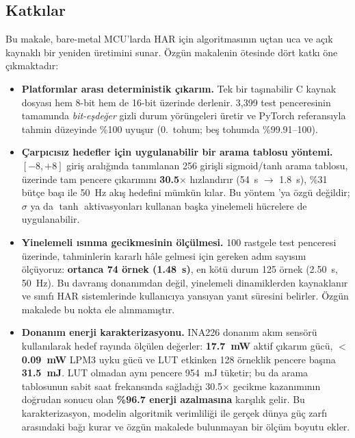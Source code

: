 \subsection{Katkılar}

Bu makale, bare-metal MCU'larda HAR için \fastgrnn{} algoritmasının
uçtan uca ve açık kaynaklı bir yeniden üretimini sunar. Özgün
makalenin ötesinde dört katkı öne çıkmaktadır:

\begin{itemize}
\item \textbf{Platformlar arası deterministik çıkarım.} Tek bir
taşınabilir C kaynak dosyası hem 8-bit \arduino{} hem de 16-bit
\msp{} üzerinde derlenir. 3{,}399 test penceresinin tamamında
\emph{bit-eşdeğer} gizli durum yörüngeleri üretir ve PyTorch
referansıyla tahmin düzeyinde \%100 uyuşur (0.~tohum; beş
tohumda \%99.91--100).

\item \textbf{Çarpıcısız hedefler için uygulanabilir bir arama
tablosu yöntemi.} $[-8, +8]$ giriş aralığında tanımlanan 256 girişli
sigmoid/tanh arama tablosu, \msp{} üzerinde tam pencere çıkarımını
\textbf{30.5$\times$} hızlandırır (54~s $\rightarrow$ 1.8~s), \%31
bütçe başı ile 50~Hz akış hedefini mümkün kılar. Bu yöntem
\fastgrnn{}'ya özgü değildir; $\sigma$ ya da $\tanh$ aktivasyonları
kullanan başka yinelemeli hücrelere de uygulanabilir.

\item \textbf{Yinelemeli ısınma gecikmesinin ölçülmesi.} 100 rastgele
test penceresi üzerinde, tahminlerin kararlı hâle gelmesi için gereken
adım sayısını ölçüyoruz: \textbf{ortanca 74 örnek (1.48~s)}, en kötü
durum 125 örnek (2.50~s, 50~Hz). Bu davranış donanımdan değil,
yinelemeli dinamiklerden kaynaklanır ve \fastgrnn{} sınıfı HAR
sistemlerinde kullanıcıya
yansıyan yanıt süresini belirler. Özgün makalede bu nokta ele
alınmamıştır.

\item \textbf{Donanım enerji karakterizasyonu.} INA226 donanım akım
sensörü kullanılarak \msp{} hedef rayında ölçülen değerler:
\textbf{17.7~mW} aktif çıkarım gücü, \textbf{$<$0.09~mW} LPM3 uyku
gücü ve LUT etkinken 128 örneklik pencere başına \textbf{31.5~mJ}.
LUT olmadan aynı pencere 954~mJ tüketir; bu da arama tablosunun sabit
saat frekansında sağladığı 30.5$\times$ gecikme kazanımının doğrudan
sonucu olan \textbf{\%96.7 enerji azalmasına} karşılık gelir. Bu
karakterizasyon, modelin algoritmik verimliliği ile gerçek dünya güç
zarfı arasındaki bağı kurar ve özgün makalede bulunmayan bir ölçüm
boyutu ekler.
\end{itemize}

